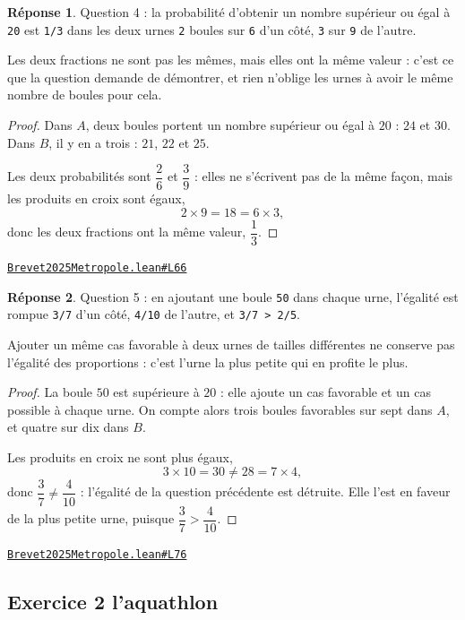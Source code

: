 \documentclass[11pt,a4paper]{article}
\theoremstyle{definition}
\theoremstyle{plain}
\theoremstyle{definition}
\newtheorem*{reponse}{Réponse}
\newcommand{\source}[2]{\par\smallskip\noindent\hfill{\footnotesize\href{#1}{\texttt{#2}}}\par\smallskip}
\begin{document}
\begin{reponse}
Question 4 : la probabilité d'obtenir un nombre supérieur ou égal à \texttt{20} est
\texttt{1/3} dans les deux urnes \textemdash{} \texttt{2} boules sur \texttt{6} d'un côté, \texttt{3} sur \texttt{9} de l'autre.

Les deux fractions ne sont pas les mêmes, mais elles ont la même valeur : c'est ce
que la question demande de démontrer, et rien n'oblige les urnes à avoir le même
nombre de boules pour cela.
\end{reponse}
\begin{proof}
Dans $A$, deux boules portent un nombre supérieur ou égal à $20$ : $24$ et $30$. Dans $B$,
il y en a trois : $21$, $22$ et $25$.

Les deux probabilités sont $\dfrac{2}{6}$ et $\dfrac{3}{9}$ : elles ne s'écrivent pas de la
même façon, mais les produits en croix sont égaux,
\[ 2 \times 9 = 18 = 6 \times 3 , \]
donc les deux fractions ont la même valeur, $\dfrac{1}{3}$.
\end{proof}
\source{https://github.com/Commutator-IO/learn-lean/blob/main/exams/2025/Brevet2025Metropole.lean\#L66}{Brevet2025Metropole.lean\#L66}

\begin{reponse}
Question 5 : en ajoutant une boule \texttt{50} dans chaque urne, l'égalité est rompue \textemdash{}
\texttt{3/7} d'un côté, \texttt{4/10} de l'autre, et \texttt{3/7 > 2/5}.

Ajouter un même cas favorable à deux urnes de tailles différentes ne conserve pas
l'égalité des proportions : c'est l'urne la plus petite qui en profite le plus.
\end{reponse}
\begin{proof}
La boule $50$ est supérieure à $20$ : elle ajoute un cas favorable et un cas possible à
chaque urne. On compte alors trois boules favorables sur sept dans $A$, et quatre sur dix
dans $B$.

Les produits en croix ne sont plus égaux,
\[ 3 \times 10 = 30 \ne 28 = 7 \times 4 , \]
donc $\dfrac{3}{7} \ne \dfrac{4}{10}$ : l'égalité de la question précédente est détruite.
Elle l'est en faveur de la plus petite urne, puisque $\dfrac{3}{7} > \dfrac{4}{10}$.
\end{proof}
\source{https://github.com/Commutator-IO/learn-lean/blob/main/exams/2025/Brevet2025Metropole.lean\#L76}{Brevet2025Metropole.lean\#L76}

\subsection{Exercice 2 \textemdash{} l'aquathlon}
\end{document}
